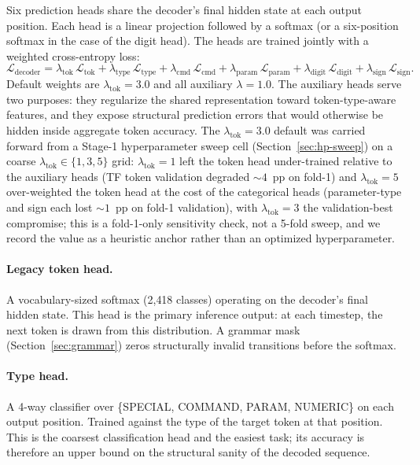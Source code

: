 \documentclass[sensors,article,submit,moreauthors,pdftex]{Definitions/mdpi}
\begin{document}
Six prediction heads share the decoder's final hidden state at each output position. Each head is a linear projection followed by a softmax (or a six-position softmax in the case of the digit head). The heads are trained jointly with a weighted cross-entropy loss:
\begin{equation*}
\mathcal{L}_{\text{decoder}} =
    \lambda_{\text{tok}}\,\mathcal{L}_{\text{tok}} +
    \lambda_{\text{type}}\,\mathcal{L}_{\text{type}} +
    \lambda_{\text{cmd}}\,\mathcal{L}_{\text{cmd}} +
    \lambda_{\text{param}}\,\mathcal{L}_{\text{param}} +
    \lambda_{\text{digit}}\,\mathcal{L}_{\text{digit}} +
    \lambda_{\text{sign}}\,\mathcal{L}_{\text{sign}}.
\end{equation*}
Default weights are $\lambda_{\text{tok}}=3.0$ and all auxiliary $\lambda=1.0$. The auxiliary heads serve two purposes: they regularize the shared representation toward token-type-aware features, and they expose structural prediction errors that would otherwise be hidden inside aggregate token accuracy. The $\lambda_{\text{tok}}=3.0$ default was carried forward from a Stage-1 hyperparameter sweep cell (Section~\ref{sec:hp-sweep}) on a coarse $\lambda_{\text{tok}}\!\in\!\{1, 3, 5\}$ grid: $\lambda_{\text{tok}}=1$ left the token head under-trained relative to the auxiliary heads (TF token validation degraded $\sim\!4$~pp on fold-1) and $\lambda_{\text{tok}}=5$ over-weighted the token head at the cost of the categorical heads (parameter-type and sign each lost $\sim\!1$~pp on fold-1 validation), with $\lambda_{\text{tok}}=3$ the validation-best compromise; this is a fold-1-only sensitivity check, not a 5-fold sweep, and we record the value as a heuristic anchor rather than an optimized hyperparameter.

\paragraph{Legacy token head.} A vocabulary-sized softmax (2{,}418 classes) operating on the decoder's final hidden state. This head is the primary inference output: at each timestep, the next token is drawn from this distribution. A grammar mask (Section~\ref{sec:grammar}) zeros structurally invalid transitions before the softmax.

\paragraph{Type head.} A 4-way classifier over \{SPECIAL, COMMAND, PARAM, NUMERIC\} on each output position. Trained against the type of the target token at that position. This is the coarsest classification head and the easiest task; its accuracy is therefore an upper bound on the structural sanity of the decoded sequence.
\end{document}
